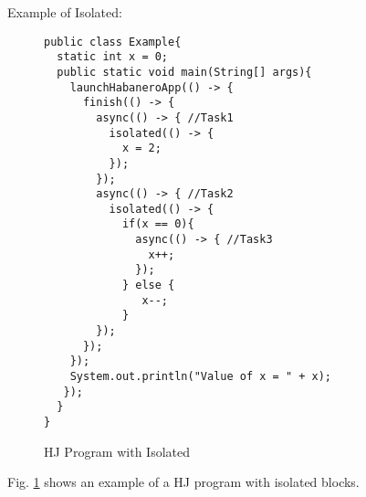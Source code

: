 \begin{enumerate}
Example of Isolated:
\begin{figure}
  \begin{center}
    \begin{lstlisting}
public class Example{
  static int x = 0;
  public static void main(String[] args){
    launchHabaneroApp(() -> {
	  finish(() -> {
	  	async(() -> { //Task1
		  isolated(() -> {
			x = 2;	
		  });
		});
		async(() -> { //Task2		
		  isolated(() -> {
			if(x == 0){
			  async(() -> { //Task3
			    x++;
			  });
			} else {
			   x--;
			}
		});
	  });
	});
	System.out.println("Value of x = " + x);	
   });
  }
}
\end{lstlisting}
  \end{center}
  \caption{HJ Program with Isolated}
  \label{fig:hj-isolated}
\end{figure}

Fig. \ref{fig:hj-isolated} shows an example of a HJ program with isolated blocks.
%
%                
%                


\end{enumerate}

